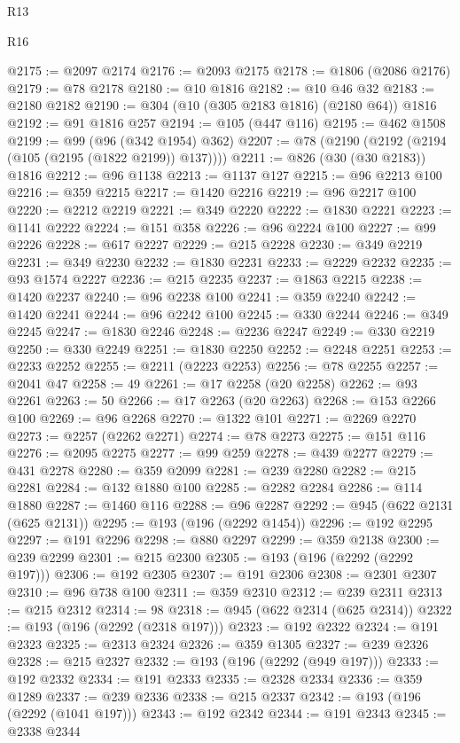 \begin{lexlean}{R13}
\begin{lexlean}{R16}
\begin{coremodule}
{{{{{{{{{{{{{{{{{{{{{{{{{{{{{{{{{{{{{{{{{{{{{{{{{{{{{{{{{{{{{{{{{{{{{{{{{{{{{{{{{{{{{{{{{{{{{{{{{{{{{{{{{{{{{{{{{@2175 := @2097 @2174
@2176 := @2093 @2175
@2178 := @1806 (@2086 @2176)
@2179 := @78 @2178
@2180 := @10 @1816
@2182 := @10 @46 @32
@2183 := @2180 @2182
@2190 := @304 (@10 (@305 @2183 @1816) (@2180 @64)) @1816
@2192 := @91 @1816 @257
@2194 := @105 (@447 @116)
@2195 := @462 @1508
@2199 := @99 (@96 (@342 @1954) @362)
@2207 := @78 (@2190 (@2192 (@2194 (@105 (@2195 (@1822 @2199)) @137))))
@2211 := @826 (@30 (@30 @2183)) @1816
@2212 := @96 @1138
@2213 := @1137 @127
@2215 := @96 @2213 @100
@2216 := @359 @2215
@2217 := @1420 @2216
@2219 := @96 @2217 @100
@2220 := @2212 @2219
@2221 := @349 @2220
@2222 := @1830 @2221
@2223 := @1141 @2222
@2224 := @151 @358
@2226 := @96 @2224 @100
@2227 := @99 @2226
@2228 := @617 @2227
@2229 := @215 @2228
@2230 := @349 @2219
@2231 := @349 @2230
@2232 := @1830 @2231
@2233 := @2229 @2232
@2235 := @93 @1574 @2227
@2236 := @215 @2235
@2237 := @1863 @2215
@2238 := @1420 @2237
@2240 := @96 @2238 @100
@2241 := @359 @2240
@2242 := @1420 @2241
@2244 := @96 @2242 @100
@2245 := @330 @2244
@2246 := @349 @2245
@2247 := @1830 @2246
@2248 := @2236 @2247
@2249 := @330 @2219
@2250 := @330 @2249
@2251 := @1830 @2250
@2252 := @2248 @2251
@2253 := @2233 @2252
@2255 := @2211 (@2223 @2253)
@2256 := @78 @2255
@2257 := @2041 @47
@2258 := 49
@2261 := @17 @2258 (@20 @2258)
@2262 := @93 @2261
@2263 := 50
@2266 := @17 @2263 (@20 @2263)
@2268 := @153 @2266 @100
@2269 := @96 @2268
@2270 := @1322 @101
@2271 := @2269 @2270
@2273 := @2257 (@2262 @2271)
@2274 := @78 @2273
@2275 := @151 @116
@2276 := @2095 @2275
@2277 := @99 @259
@2278 := @439 @2277
@2279 := @431 @2278
@2280 := @359 @2099
@2281 := @239 @2280
@2282 := @215 @2281
@2284 := @132 @1880 @100
@2285 := @2282 @2284
@2286 := @114 @1880
@2287 := @1460 @116
@2288 := @96 @2287
@2292 := @945 (@622 @2131 (@625 @2131))
@2295 := @193 (@196 (@2292 @1454))
@2296 := @192 @2295
@2297 := @191 @2296
@2298 := @880 @2297
@2299 := @359 @2138
@2300 := @239 @2299
@2301 := @215 @2300
@2305 := @193 (@196 (@2292 (@2292 @197)))
@2306 := @192 @2305
@2307 := @191 @2306
@2308 := @2301 @2307
@2310 := @96 @738 @100
@2311 := @359 @2310
@2312 := @239 @2311
@2313 := @215 @2312
@2314 := 98
@2318 := @945 (@622 @2314 (@625 @2314))
@2322 := @193 (@196 (@2292 (@2318 @197)))
@2323 := @192 @2322
@2324 := @191 @2323
@2325 := @2313 @2324
@2326 := @359 @1305
@2327 := @239 @2326
@2328 := @215 @2327
@2332 := @193 (@196 (@2292 (@949 @197)))
@2333 := @192 @2332
@2334 := @191 @2333
@2335 := @2328 @2334
@2336 := @359 @1289
@2337 := @239 @2336
@2338 := @215 @2337
@2342 := @193 (@196 (@2292 (@1041 @197)))
@2343 := @192 @2342
@2344 := @191 @2343
@2345 := @2338 @2344
}}}}}}}}}}}}}}}}}}}}}}}}}}}}}}}}}}}}}}}}}}}}}}}}}}}}}}}}}}}}}}}}}}}}}}}}}}}}}}}}}}}}}}}}}}}}}}}}}}}}}}}}}}}}}}}}}
\end{coremodule}
\end{lexlean}
\end{lexlean}
